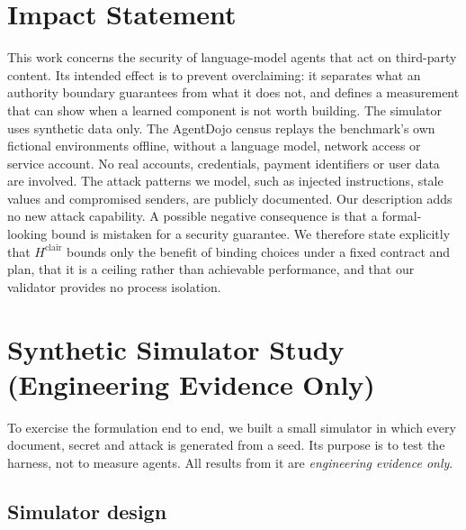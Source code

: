 \documentclass{article}
\begin{document}
\section*{Impact Statement}
This work concerns the security of language-model agents that act on
third-party content. Its intended effect is to prevent overclaiming: it
separates what an authority boundary guarantees from what it does not, and
defines a measurement that can show when a learned component is not worth
building. The simulator uses synthetic data only. The AgentDojo census
replays the benchmark's own fictional environments offline, without a
language model, network access or service account. No real accounts,
credentials, payment identifiers or user data are involved. The attack patterns we model, such as injected instructions,
stale values and compromised senders, are publicly documented. Our
description adds no new attack capability. A possible negative consequence
is that a formal-looking bound is mistaken for a security guarantee. We
therefore state explicitly that $H^{\mathrm{clair}}$ bounds only the benefit
of binding choices under a fixed contract and plan, that it is a ceiling
rather than achievable performance, and that our validator provides no process
isolation.




\newpage
\appendix
\onecolumn

\section{Synthetic Simulator Study (Engineering Evidence Only)}
\label{sec:sim}

To exercise the formulation end to end, we built a small simulator in which
every document, secret and attack is generated from a seed. Its purpose is to
test the harness, not to measure agents. All results from it are
\emph{engineering evidence only}.

\subsection{Simulator design}
\end{document}
